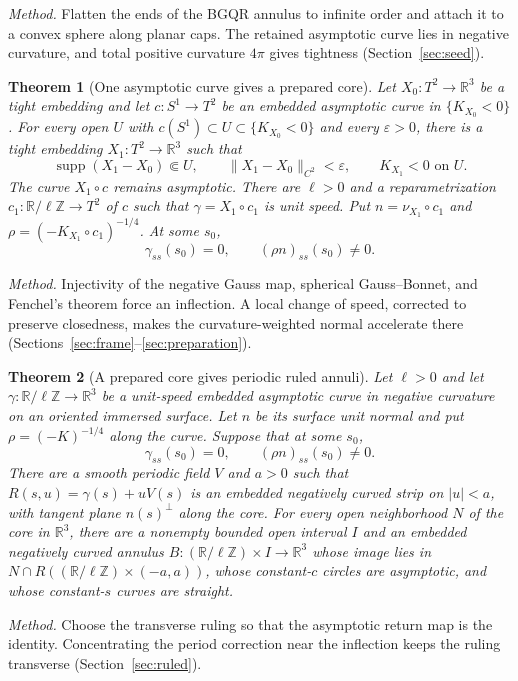 \documentclass[11pt]{amsart}
\newtheorem{theorem}{Theorem}[section]
\theoremstyle{definition}
\newcommand{\R}{\mathbb R}
\DeclareMathOperator{\supp}{supp}
\begin{document}
\emph{Method.} Flatten the ends of the BGQR annulus to infinite order
and attach it to a convex sphere along planar caps. The retained
asymptotic curve lies in negative curvature, and total positive
curvature $4\pi$ gives tightness (Section~\ref{sec:seed}).

\begin{theorem}[One asymptotic curve gives a prepared core]
\label{thm:prepared-core}
Let $X_0:T^2\to\R^3$ be a tight embedding and let $c:S^1\to T^2$
be an embedded asymptotic curve in $\{K_{X_0}<0\}$. For every open
$U$ with $c(S^1)\subset U\subset\{K_{X_0}<0\}$ and every
$\varepsilon>0$, there is a tight embedding $X_1:T^2\to\R^3$ such that
\[
 \supp(X_1-X_0)\Subset U,\qquad
 \|X_1-X_0\|_{C^2}<\varepsilon,\qquad K_{X_1}<0\text{ on }U.
\]
The curve $X_1\circ c$ remains asymptotic. There are $\ell>0$ and a
reparametrization $c_1:\R/\ell\mathbb Z\to T^2$ of $c$ such that
$\gamma=X_1\circ c_1$ is unit speed. Put $n=\nu_{X_1}\circ c_1$
and $\rho=(-K_{X_1}\circ c_1)^{-1/4}$. At some $s_0$,
\[
 \gamma_{ss}(s_0)=0,\qquad (\rho n)_{ss}(s_0)\ne0.
\]
\end{theorem}

\emph{Method.} Injectivity of the negative Gauss map, spherical
Gauss--Bonnet, and Fenchel's theorem force an inflection. A local
change of speed, corrected to preserve closedness, makes the
curvature-weighted normal accelerate there
(Sections~\ref{sec:frame}--\ref{sec:preparation}).

\begin{theorem}[A prepared core gives periodic ruled annuli]
\label{thm:ruled-interface}
Let $\ell>0$ and let $\gamma:\R/\ell\mathbb Z\to\R^3$ be a
unit-speed embedded asymptotic curve in negative curvature on an
oriented immersed surface. Let $n$ be its surface unit normal and put
$\rho=(-K)^{-1/4}$ along the curve. Suppose that at some $s_0$,
\[
 \gamma_{ss}(s_0)=0,\qquad (\rho n)_{ss}(s_0)\ne0.
\]
There are a smooth periodic field $V$ and $a>0$ such that
$R(s,u)=\gamma(s)+uV(s)$ is an embedded negatively curved strip on
$|u|<a$, with tangent plane $n(s)^\perp$ along the core.
For every open neighborhood $N$ of the core in $\R^3$, there are a
nonempty bounded open interval $I$ and an embedded negatively curved annulus
$B:(\R/\ell\mathbb Z)\times I\to\R^3$ whose image lies in
$N\cap R((\R/\ell\mathbb Z)\times(-a,a))$, whose constant-$c$
circles are asymptotic, and whose constant-$s$ curves are straight.
\end{theorem}

\emph{Method.} Choose the transverse ruling so that the asymptotic
return map is the identity. Concentrating the period correction near
the inflection keeps the ruling transverse
(Section~\ref{sec:ruled}).
\end{document}
